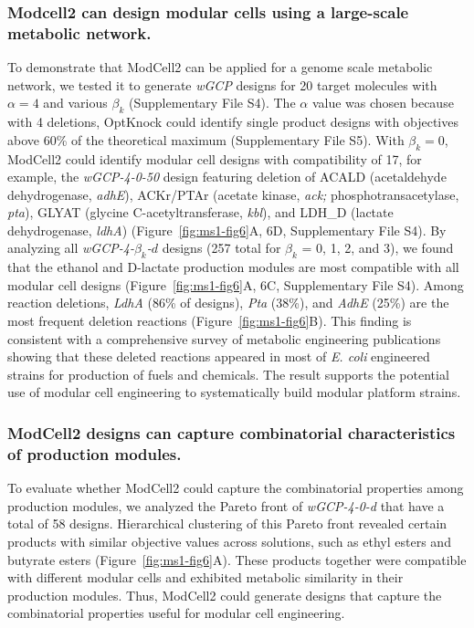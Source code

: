 \subsubsection{Modcell2 can design modular cells using a large-scale
metabolic network.}
To demonstrate that ModCell2 can be applied for a
genome scale metabolic network, we tested it to generate \emph{wGCP}
designs for 20 target molecules with \(\alpha = 4\) and various
\(\beta_{k}\) (Supplementary File S4). The \(\alpha\) value was chosen
because with 4 deletions, OptKnock could identify single product designs
with objectives above 60\% of the theoretical maximum (Supplementary
File S5). With \(\beta_{k} = 0\), ModCell2 could identify modular cell
designs with compatibility of 17, for example, the \emph{wGCP-4-0-50}
design featuring deletion of ACALD (acetaldehyde dehydrogenase,
\emph{adhE}), ACKr/PTAr (acetate kinase, \emph{ack;}
phosphotransacetylase, \emph{pta}), GLYAT (glycine C-acetyltransferase,
\emph{kbl}), and LDH\_D (lactate dehydrogenase, \emph{ldhA}) (Figure~\ref{fig:ms1-fig6}A,
6D, Supplementary File S4). By analyzing all
\emph{wGCP-4-}\(\beta_{k}\)\emph{-}\(d\) designs (257 total for
\(\beta_{k}\) = 0, 1, 2, and 3), we found that the ethanol and D-lactate
production modules are most compatible with all modular cell designs
(Figure~\ref{fig:ms1-fig6}A, 6C, Supplementary File S4). Among reaction deletions,
\emph{LdhA} (86\% of designs), \emph{Pta} (38\%), and \emph{AdhE} (25\%)
are the most frequent deletion reactions (Figure~\ref{fig:ms1-fig6}B). This finding is
consistent with a comprehensive survey of metabolic engineering
publications \citep{winkler2015} showing that these deleted
reactions appeared in most of \emph{E. coli} engineered strains for
production of fuels and chemicals. The result supports the potential use
of modular cell engineering to systematically build modular platform
strains.

\subsubsection{ModCell2 designs can capture combinatorial characteristics
of production modules.} To evaluate whether ModCell2 could capture the
combinatorial properties among production modules, we analyzed the
Pareto front of \emph{wGCP-4-0-d} that have a total of 58 designs.
Hierarchical clustering of this Pareto front revealed certain products
with similar objective values across solutions, such as ethyl esters and
butyrate esters (Figure~\ref{fig:ms1-fig6}A). These products together were compatible
with different modular cells and exhibited metabolic similarity in their
production modules. Thus, ModCell2 could generate designs that capture
the combinatorial properties useful for modular cell engineering.

